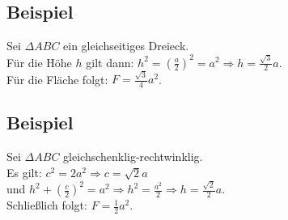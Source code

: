 \subsection{Beispiel}

	Sei $\Delta ABC$ ein gleichseitiges Dreieck.\\
	\newline
	Für die Höhe $h$ gilt dann: $h^2=\left(\frac{a}{2}\right)^2=a^2\Rightarrow h=\frac{\sqrt{3}}{2}a$.\\
	Für die Fläche folgt: $F=\frac{\sqrt{3}}{4}a^2$.


\subsection{Beispiel}

	
	Sei $\Delta ABC$ gleichschenklig-rechtwinklig.\\
	\newline
	Es gilt: $c^2=2a^2\Rightarrow c=\sqrt{2}a$\\
	und $h^2+\left(\frac{c}{2}\right)^2=a^2\Rightarrow h^2=\frac{a^2}{2}\Rightarrow h=\frac{\sqrt{2}}{2}a$.\\
	Schließlich folgt: $F=\frac{1}{2}a^2$.
	
























	
	
	
	
	
	
	
